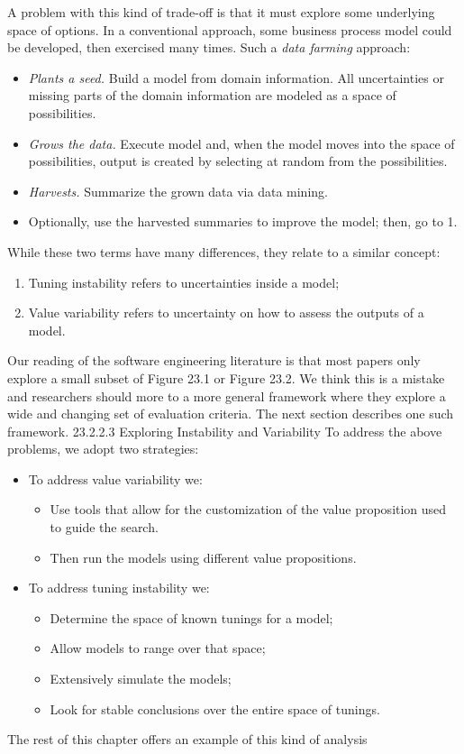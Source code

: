 \documentclass[table, xcdraw, sigconf,review, anonymous]{acmart}
\begin{document}
A problem with this kind of trade-off is that it must explore some
underlying space of options.  In a conventional approach, some
business process model could be developed, then exercised many
times. Such a {\em data farming} approach: 
\begin{itemize}
\item
{\em Plants a seed.} Build a model from domain information. All uncertainties or missing parts of the domain information are modeled as a space of possibilities.
\item {\em Grows the data.} Execute model and, when the model moves into the space of possibilities, output is created by selecting at random from the possibilities.
\item {\em Harvests.} Summarize the grown data via data mining.
\item Optionally, use the harvested summaries to improve the model;
  then, go to 1. 
\end{itemize}
  
  
  While these two terms have many differences, they relate to a similar concept:
\begin{enumerate}
\item Tuning instability refers to uncertainties inside a model;
\item Value variability refers to uncertainty on how to assess the outputs of a model.
\end{enumerate}
Our reading of the software engineering literature is that most papers only explore
a small subset of Figure 23.1 or Figure 23.2. We think this is a mistake and researchers
should more to a more general framework where they explore a wide and changing set
of evaluation criteria. The next section describes one such framework.
23.2.2.3 Exploring Instability and Variability
To address the above problems, we adopt two strategies:
\begin{itemize}
\item  To address value variability we:
\begin{itemize}
    \item Use tools that allow for the customization of the value proposition used to
    guide the search.
    \item Then run the models using different value propositions.
\end{itemize}
\item To address tuning instability we:
\begin{itemize}
    \item Determine the space of known tunings for a model;
    \item Allow models to range over that space;
    \item Extensively simulate the models;
    \item Look for stable conclusions over the entire space of tunings.
\end{itemize}
\end{itemize}
The rest of this chapter offers an example of this kind of analysis
\end{document}

